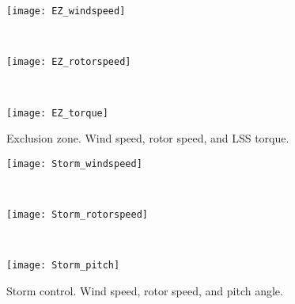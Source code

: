 \begin{figure}[!t]
\begin{center}
\parbox{0.9\columnwidth}{\mbox{\texttt{[image: EZ\_windspeed]}}}\\
\parbox{0.9\columnwidth}{\mbox{\texttt{[image: EZ\_rotorspeed]}}}\\
\parbox{0.9\columnwidth}{\mbox{\texttt{[image: EZ\_torque]}}}
\caption{Exclusion zone. Wind speed, rotor speed, and LSS torque.}\label{f:EZ}
\end{center}
\end{figure}

\begin{figure}[!t]
\begin{center}
\parbox{0.9\columnwidth}{\mbox{\texttt{[image: Storm\_windspeed]}}}\\
\parbox{0.9\columnwidth}{\mbox{\texttt{[image: Storm\_rotorspeed]}}}\\
\parbox{0.9\columnwidth}{\mbox{\texttt{[image: Storm\_pitch]}}}
\caption{Storm control. Wind speed, rotor speed, and pitch angle.}\label{f:StormControl}
\end{center}
\end{figure}